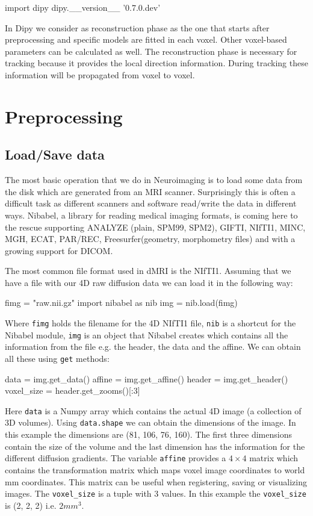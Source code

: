 \documentclass{bioinfo}
\begin{document}
\begin{python}
import dipy
dipy.__version__
'0.7.0.dev'
\end{python}

In Dipy we consider as reconstruction phase as the one that starts after preprocessing and specific models are fitted in each voxel. Other voxel-based parameters can be calculated as well. The reconstruction phase is necessary for tracking because it provides the local direction information. During tracking these information will be propagated from voxel to voxel.


\section{Preprocessing}

\subsection{Load/Save data}\label{loadsave}
The most basic operation that we do in Neuroimaging is to load some data from the disk which are generated from an MRI scanner. Surprisingly this is often a difficult task as different scanners and software read/write the data in different ways. Nibabel, a library for reading medical imaging formats, is coming here to the rescue supporting ANALYZE (plain, SPM99, SPM2), GIFTI, NIfTI1, MINC, MGH, ECAT, PAR/REC, Freesurfer(geometry, morphometry files) and with a growing support for DICOM.

The most common file format used in dMRI is the NIfTI1. Assuming that we have a file with our 4D raw diffusion data we can load it in the following way:
\begin{python}
fimg = "raw.nii.gz"
import nibabel as nib
img = nib.load(fimg)
\end{python}
Where \texttt{fimg} holds the filename for the 4D NIfTI1 file, \texttt{nib} is a shortcut for the Nibabel module, \texttt{img} is an object that Nibabel creates which contains all the information from the file e.g. the header, the data and the affine. We can obtain all these using \texttt{get} methods:
\begin{python}
data = img.get_data()
affine = img.get_affine()
header = img.get_header()
voxel_size = header.get_zooms()[:3]
\end{python}
Here \texttt{data} is a Numpy array which contains the actual 4D image (a collection of 3D volumes). Using \texttt{data.shape} we can obtain the dimensions of the image. In this example the dimensions are (81, 106, 76, 160). The first three dimensions contain the size of the volume and the last dimension has the information for the different diffusion gradients. The variable \texttt{affine} provides a $4\times4$ matrix which contains the transformation matrix which maps voxel image coordinates to world mm coordinates. This matrix can be useful when registering, saving or visualizing images. The \texttt{voxel\_size} is a tuple with 3 values. In this example the \texttt{voxel\_size} is (2, 2, 2) i.e. $2mm^3$.
\end{document}

